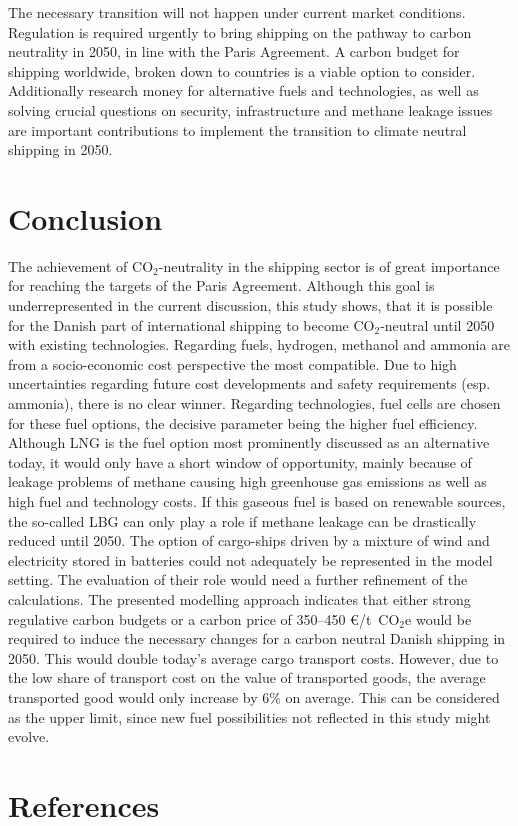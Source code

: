 \documentclass[article]{elsarticle}
\begin{document}
The necessary transition will not happen under current market conditions. Regulation is required urgently to bring shipping on the pathway to carbon neutrality in 2050, in line with the Paris Agreement. A carbon budget for shipping worldwide, broken down to countries is a viable option to consider. Additionally research money for alternative fuels and technologies, as well as solving crucial questions on security, infrastructure and methane leakage issues are important contributions to implement the transition to climate neutral shipping in 2050. 


\section{Conclusion}
\label{sec:Conclusion}
The achievement of CO$_2$-neutrality in the shipping sector is of great importance for reaching the targets of the Paris Agreement. Although this goal is underrepresented in the current discussion, this study shows, that it is possible for the Danish part of international shipping to become CO$_2$-neutral until 2050 with existing technologies. Regarding fuels, hydrogen, methanol and ammonia are from a socio-economic cost perspective the most compatible. Due to high uncertainties regarding future cost developments and safety requirements (esp. ammonia), there is no clear winner. Regarding technologies, fuel cells are chosen for these fuel options, the decisive parameter being the higher fuel efficiency. Although LNG is the fuel option most prominently discussed as an alternative today, it would only have a short window of opportunity, mainly because of leakage problems of methane causing high greenhouse gas emissions as well as high fuel and technology costs. If this gaseous fuel is based on renewable sources, the so-called LBG can only play a role if methane leakage can be drastically reduced until 2050. The option of cargo-ships driven by a mixture of wind and electricity stored in batteries could not adequately be represented in the model setting. The evaluation of their role would need a further refinement of the calculations.
The presented modelling approach indicates that either strong regulative carbon budgets or a carbon price of 350--450 \euro/t~CO$_2$e would be required to induce the necessary changes for a carbon neutral Danish shipping in 2050. This would double today's average cargo transport costs. However, due to the low share of transport cost on the value of transported goods, the average transported good would only increase by 6\% on average. This can be considered as the upper limit, since new fuel possibilities not reflected in this study might evolve.

\section*{References}


\end{document}
